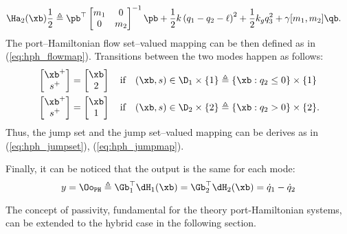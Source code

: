 \begin{exmp}
\begin{align}
        &\Ha_2(\xb) \frac{1}{2}\triangleq \pb^\top\begin{bmatrix}m_1&0\\0&m_2\end{bmatrix}^{-1}\pb + \frac{1}{2}k\left(q_1-q_2-\ell\right)^2 + \frac{1}{2}k_g q_3^2+ \gamma[m_1,m_2]\qb.
    \end{align}
    The port--Hamiltonian flow set--valued mapping can be then defined as in (\ref{eq:hph_flowmap}). Transitions between the two modes happen as follows:
    \begin{align}
        &\begin{bmatrix}\xb^+\\s^+\end{bmatrix} = \begin{bmatrix}\xb\\2\end{bmatrix}\quad\text{if}\quad(\xb,s)\in\D_1\times\{1\}\triangleq\{\xb:q_2\leq 0\}\times\{1\}\\
        &\begin{bmatrix}\xb^+\\s^+\end{bmatrix} = \begin{bmatrix}\xb\\1\end{bmatrix}\quad\text{if}\quad(\xb,s)\in\D_2\times\{2\}\triangleq\{\xb:q_2> 0\}\times\{2\}.
    \end{align}
    Thus, the jump set and the jump set--valued mapping can be derives as in (\ref{eq:hph_jumpset}), (\ref{eq:hph_jumpmap}).
    
    Finally, it can be noticed that the output is the same for each mode:
    \begin{equation}
        y = \Oo_{\tt PH}\triangleq\Gb_1^\top\dH_1(\xb) = \Gb_2^\top\dH_2(\xb) = \dot{q}_1 - \dot{q}_2  
    \end{equation}
\end{exmp}
%
%
The concept of passivity, fundamental for the
theory port-Hamiltonian systems, can be extended to
the hybrid case in the following section.
%
\clearpage
%
